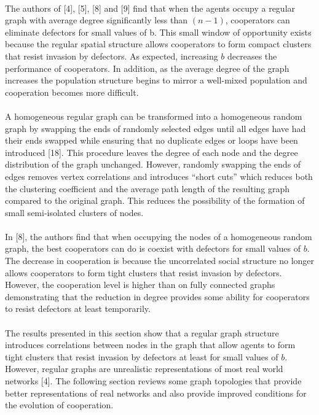 \documentclass{article}
\begin{document}
    \paragraph{}The authors of [4], [5], [8] and [9] find that when the agents occupy a regular graph with average degree significantly less than $(n-1)$, cooperators can eliminate defectors for small values of b.  This small window of opportunity exists because the regular spatial structure allows cooperators to form compact clusters that resist invasion by defectors.  As expected, increasing $b$ decreases the performance of cooperators.  In addition, as the average degree of the graph increases the population structure begins to mirror a well-mixed population and cooperation becomes more difficult.
    \paragraph{}A homogeneous regular graph can be transformed into a homogeneous random graph by swapping the ends of randomly selected edges until all edges have had their ends swapped while ensuring that no duplicate edges or loops have been introduced [18].  This procedure leaves the degree of each node and the degree distribution of the graph unchanged. However, randomly swapping the ends of edges removes vertex correlations and introduces “short cuts” which reduces both the clustering coefficient and the average path length of the resulting graph compared to the original graph.  This reduces the possibility of the formation of small semi-isolated clusters of nodes.
    \paragraph{}In [8], the authors find that when occupying the nodes of a homogeneous random graph, the best cooperators can do is coexist with defectors for small values of $b$.  The decrease in cooperation is because the uncorrelated social structure no longer allows cooperators to form tight clusters that resist invasion by defectors.  However, the cooperation level is higher than on fully connected graphs demonstrating that the reduction in degree provides some ability for cooperators to resist defectors at least temporarily.
    \paragraph{} The results presented in this section show that a regular graph structure introduces correlations between nodes in the graph that allow agents to form tight clusters that resist invasion by defectors at least for small values of $b$.  However, regular graphs are unrealistic representations of most real world networks [4].  The following section reviews some graph topologies that provide better representations of real networks and also provide improved conditions for the evolution of cooperation.
\end{document}
